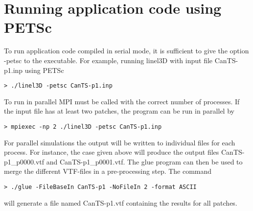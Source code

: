 \documentclass[a4wide,11pt]{article}
\begin{document}
\section{Running application code using PETSc}
To run application code compiled in serial mode, it is sufficient
to give the option \textsf{-petsc} to the executable. For example,
running \textsf{linel3D} with input file \textsf{CanTS-p1.inp} using
PETSc 
\begin{verbatim}
> ./linel3D -petsc CanTS-p1.inp
\end{verbatim}
To run in parallel MPI must be called with the correct number of
processes. If the input file has at least two patches, the program
can be run in parallel by
\begin{verbatim}
> mpiexec -np 2 ./linel3D -petsc CanTS-p1.inp
\end{verbatim}
For parallel simulations the output will be written to individual 
files for each process. For instance, the case given above will produce
the output files \textsf{CanTS-p1\_p0000.vtf} and \textsf{CanTS-p1\_p0001.vtf}.
The \textsf{glue} program can then be used to merge the different VTF-files
in a pre-processing step. The command
\begin{verbatim}
> ./glue -FileBaseIn CanTS-p1 -NoFileIn 2 -format ASCII
\end{verbatim}
will generate a file named \textsf{CanTS-p1.vtf} containing the
results for all patches.
\end{document}
